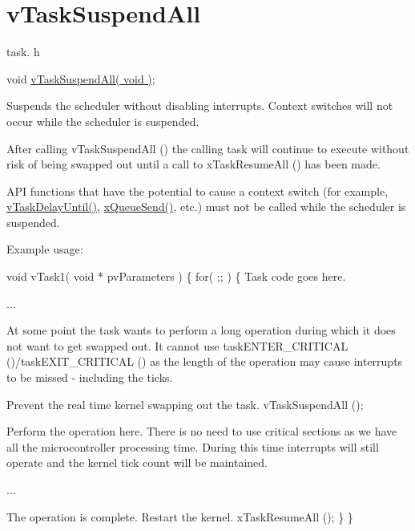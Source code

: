 \hypertarget{group__vTaskSuspendAll}{\section{v\-Task\-Suspend\-All}
\label{group__vTaskSuspendAll}
}
task. h 
\begin{DoxyPre}void \hyperlink{task_8h_a366b302eba79d10b5ee2a3756f0fcc43}{vTaskSuspendAll( void )};\end{DoxyPre}


Suspends the scheduler without disabling interrupts. Context switches will not occur while the scheduler is suspended.

After calling v\-Task\-Suspend\-All () the calling task will continue to execute without risk of being swapped out until a call to x\-Task\-Resume\-All () has been made.

A\-P\-I functions that have the potential to cause a context switch (for example, \hyperlink{task_8h_a067da3e949e248096ec6c01f9cb75a47}{v\-Task\-Delay\-Until()}, \hyperlink{queue_8h_af7eb49d3249351176992950d9185abe9}{x\-Queue\-Send()}, etc.) must not be called while the scheduler is suspended.

Example usage\-: 
\begin{DoxyPre}
 void vTask1( void * pvParameters )
 \{
     for( ;; )
     \{
Task code goes here.\end{DoxyPre}



\begin{DoxyPre}...\end{DoxyPre}



\begin{DoxyPre}At some point the task wants to perform a long operation during
which it does not want to get swapped out.  It cannot use
taskENTER\_CRITICAL ()/taskEXIT\_CRITICAL () as the length of the
operation may cause interrupts to be missed - including the
ticks.\end{DoxyPre}



\begin{DoxyPre}Prevent the real time kernel swapping out the task.
         vTaskSuspendAll ();\end{DoxyPre}



\begin{DoxyPre}Perform the operation here.  There is no need to use critical
sections as we have all the microcontroller processing time.
During this time interrupts will still operate and the kernel
tick count will be maintained.\end{DoxyPre}



\begin{DoxyPre}...\end{DoxyPre}



\begin{DoxyPre}The operation is complete.  Restart the kernel.
         xTaskResumeAll ();
     \}
 \}
   \end{DoxyPre}
 